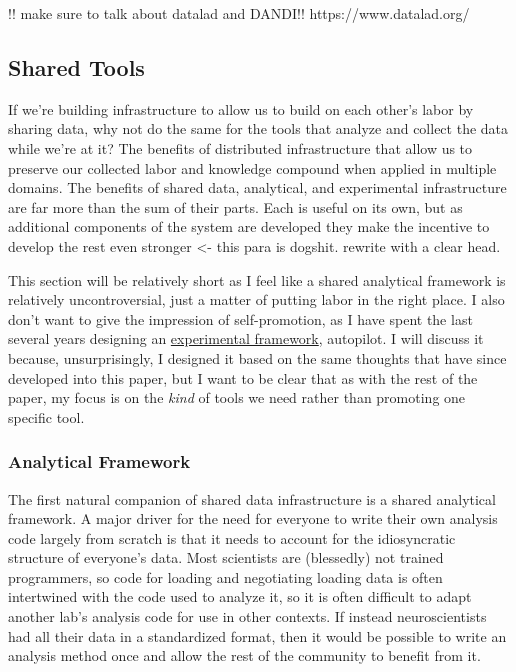 \documentclass[nohyper]{tufte-book-jls}
\begin{document}
!! make sure to talk about datalad and DANDI!! https://www.datalad.org/

\hypertarget{shared-tools}{%
\subsection{Shared Tools}\label{shared-tools}}

If we're building infrastructure to allow us to build on each other's
labor by sharing data, why not do the same for the tools that analyze
and collect the data while we're at it? The benefits of distributed
infrastructure that allow us to preserve our collected labor and
knowledge compound when applied in multiple domains. The benefits of
shared data, analytical, and experimental infrastructure are far more
than the sum of their parts. Each is useful on its own, but as
additional components of the system are developed they make the
incentive to develop the rest even stronger \textless- this para is
dogshit. rewrite with a clear head.

This section will be relatively short as I feel like a shared analytical
framework is relatively uncontroversial, just a matter of putting labor
in the right place. I also don't want to give the impression of
self-promotion, as I have spent the last several years designing an
\href{https://docs.auto-pi-lot.com}{experimental framework}, autopilot.
I will discuss it because, unsurprisingly, I designed it based on the
same thoughts that have since developed into this paper, but I want to
be clear that as with the rest of the paper, my focus is on the
\emph{kind} of tools we need rather than promoting one specific tool.

\hypertarget{analytical-framework}{%
\subsubsection{Analytical Framework}\label{analytical-framework}}

The first natural companion of shared data infrastructure is a shared
analytical framework. A major driver for the need for everyone to write
their own analysis code largely from scratch is that it needs to account
for the idiosyncratic structure of everyone's data. Most scientists are
(blessedly) not trained programmers, so code for loading and negotiating
loading data is often intertwined with the code used to analyze it, so
it is often difficult to adapt another lab's analysis code for use in
other contexts. If instead neuroscientists had all their data in a
standardized format, then it would be possible to write an analysis
method once and allow the rest of the community to benefit from it.
\end{document}
